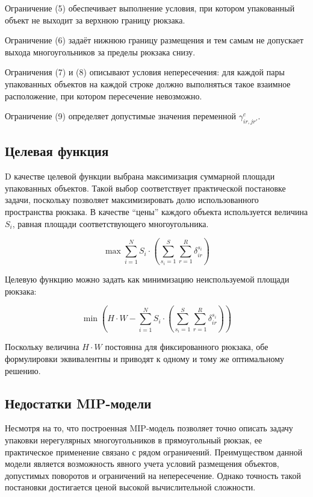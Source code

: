 \documentclass[a4paper]{article}
\begin{document}
    Ограничение (5) обеспечивает выполнение условия, при котором упакованный объект не выходит за верхнюю границу рюкзака.
    
    Ограничение (6) задаёт нижнюю границу размещения и тем самым не допускает выхода многоугольников за пределы рюкзака снизу.
    
    Ограничения (7) и (8) описывают условия непересечения: для каждой пары упакованных объектов на каждой строке должно выполняться такое взаимное расположение, при котором пересечение невозможно.
    
    Ограничение (9) определяет допустимые значения переменной $\gamma_{ir,jr'}^c$.

	\subsection{Целевая функция}
    
    D качестве целевой функции выбрана максимизация суммарной площади упакованных объектов. Такой выбор соответствует практической постановке задачи, поскольку позволяет максимизировать долю использованного пространства рюкзака. В качестве ``цены'' каждого объекта используется величина $S_i$, равная площади соответствующего многоугольника.
    
    \begin{equation}
    \max \sum_{i=1}^{N} S_i \cdot \left( \sum_{s_i=1}^{S} \sum_{r=1}^{R} \delta_{ir}^{s_i} \right)
    \end{equation}
    
    Целевую функцию можно задать как минимизацию неиспользуемой площади рюкзака:
    
    \begin{equation}
    \min \left( H \cdot W - \sum_{i=1}^{N} S_i \cdot \left( \sum_{s_i=1}^{S} \sum_{r=1}^{R} \delta_{ir}^{s_i} \right) \right)
    \end{equation}
    
    Поскольку величина $H \cdot W$ постоянна для фиксированного рюкзака, обе формулировки эквивалентны и приводят к одному и тому же оптимальному решению. 

	\subsection{Недостатки MIP-модели} %
    Несмотря на то, что построенная MIP-модель позволяет точно описать задачу упаковки нерегулярных многоугольников в прямоугольный рюкзак, ее практическое применение связано с рядом ограничений. Преимуществом данной модели является возможность явного учета условий размещения объектов, допустимых поворотов и ограничений на непересечение. Однако точность такой постановки достигается ценой высокой вычислительной сложности.
\end{document}
